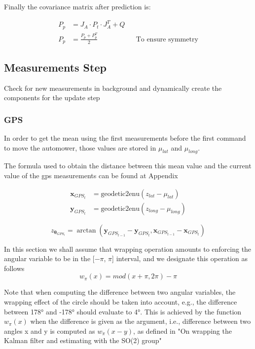 Finally the covariance matrix after prediction is:

\begin{align}
    P_{p} & = J_A \cdot P_t \cdot J_A^T + Q && \\
    P_{p} & =  \frac{P_{p} +  P_{p}^T}{2} && \text{To ensure symmetry} 
\end{align}


\subsection{Measurements Step}
Check for new measurements in background and dynamically create the components for the update step

\subsubsection{GPS}

In order to get the mean using the first measurements before the first command to move the automower, those values are stored in $\mu_{lat}$ and $\mu_{long}$.

The formula used to obtain the distance between this mean value and the current value of the gps measurements can be found at Appendix

\begin{align}
\mathbf{x}_{GPS_t} & = \text{geodetic2enu}( z_{lat} - \mu_{lat})\\
\mathbf{y}_{GPS_t} & = \text{geodetic2enu}( z_{long} - \mu_{long})
\end{align}

\begin{equation}
z_{\boldsymbol \theta_{GPS_t}} = \arctan(\mathbf{y}_{GPS_{t-1}} - \mathbf{y}_{GPS_t}, \mathbf{x}_{GPS_{t-1}} - \mathbf{x}_{GPS_t} )
\end{equation}

In this section we shall assume that wrapping operation
amounts to enforcing the angular variable to be in the [$-\pi$, $\pi$]
interval, and we designate this operation as follows
\begin{equation}
w_{\pi}(x) = mod(x + \pi, 2\pi) - \pi
\end{equation}

Note that when computing the difference between two angular
variables, the wrapping effect of the circle should be taken into
account, e.g., the difference between 178° and -178° should
evaluate to 4°. This is achieved by the function $w_{\pi}(x)$ when the difference
is given as the argument, i.e., difference between two angles
x and y is computed as $w_{\pi}(x-y)$, as defined in "On wrapping the Kalman filter and estimating with
the SO(2) group"

